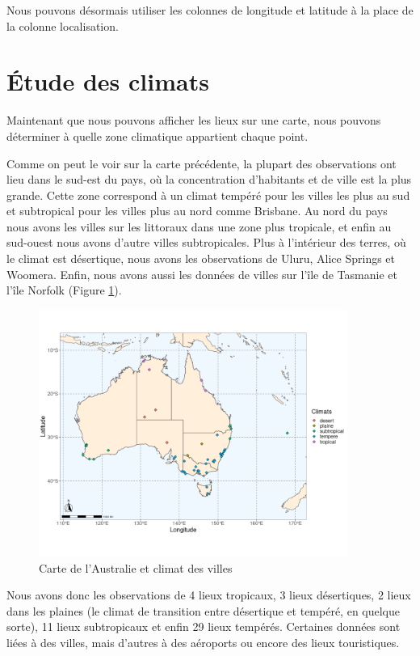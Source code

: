 \documentclass{article}
\begin{document}
Nous pouvons désormais utiliser les colonnes de longitude et latitude à la place de la colonne localisation. 

\section{Étude des climats}

Maintenant que nous pouvons afficher les lieux sur une carte, nous pouvons déterminer à quelle zone climatique appartient chaque point.

Comme on peut le voir sur la carte précédente, la plupart des observations ont lieu dans le sud-est du pays, où la concentration d'habitants et de ville est la plus grande. Cette zone correspond à un climat tempéré pour les villes les plus au sud et subtropical pour les villes plus au nord comme Brisbane. Au nord du pays nous avons les villes sur les littoraux dans une zone plus tropicale, et enfin au sud-ouest nous avons d'autre villes subtropicales. Plus à l'intérieur des terres, où le climat est désertique, nous avons les observations de Uluru, Alice Springs et Woomera. Enfin, nous avons aussi les données de villes sur l'île de Tasmanie et l'île Norfolk (Figure \ref{fig:carte_climats}). 

\begin{figure}[htp]
    \centering
    \includegraphics[width=0.9\textwidth]{Images/Cartographie/Australia_climates.png}
    \caption{Carte de l'Australie et climat des villes}
    \label{fig:carte_climats}
\end{figure}

Nous avons donc les observations de 4 lieux tropicaux, 3 lieux désertiques, 2 lieux dans les plaines (le climat de transition entre désertique et tempéré, en quelque sorte), 11 lieux subtropicaux et enfin 29 lieux tempérés. Certaines données sont liées à des villes, mais d'autres à des aéroports ou encore des lieux touristiques.
\end{document}
